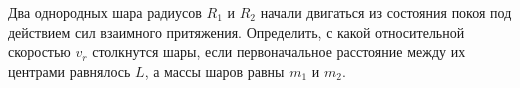 Два однородных шара радиусов $R_1$ и $R_2$ начали двигаться из состояния
покоя под действием сил взаимного притяжения. Определить, с какой
относительной скоростью $v_r$ столкнутся шары, если первоначальное
расстояние между их центрами равнялось $L$, а массы шаров равны $m_1$ и
$m_2$.
